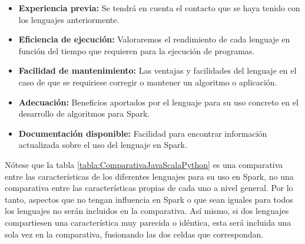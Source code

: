 \begin{itemize}
	\item \textbf{Experiencia previa:} Se tendrá en cuenta el contacto que se haya tenido con los lenguajes anteriormente.
	\item \textbf{Eficiencia de ejecución:} Valoraremos el rendimiento de cada lenguaje en función del tiempo que requieren para la ejecución de programas. 
	\item \textbf{Facilidad de mantenimiento:}  Las ventajas y facilidades del lenguaje en el caso de que se requiriese corregir o mantener un algoritmo o aplicación. 
	\item \textbf{Adecuación:} Beneficios aportados por el lenguaje para su uso concreto en el desarrollo de algoritmos para Spark.
	\item \textbf{Documentación disponible:} Facilidad para encontrar información actualizada sobre el uso del lenguaje en Spark.
	
\end{itemize}

Nótese que la tabla \ref{tabla:ComparativaJavaScalaPython} es una comparativa entre las características de los diferentes lenguajes para su uso en Spark, no una comparativa entre las características propias de cada uno a nivel general. Por lo tanto, aspectos que no tengan influencia en Spark o que sean iguales para todos los lenguajes no serán incluidos en la comparativa. Así mismo, si dos lenguajes compartiesen una característica muy parecida o idéntica, esta será incluida una sola vez en la comparativa, fusionando las dos celdas que correspondan.

